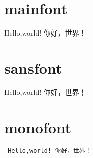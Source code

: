\documentclass{ctexart}
\begin{document}
\section{mainfont}

Hello,world!
你好，世界！



\section{sansfont}

{\sf 
Hello,world!
你好，世界！
}

\section{monofont}

{\tt
Hello,world!
你好，世界！
}
\end{document}
